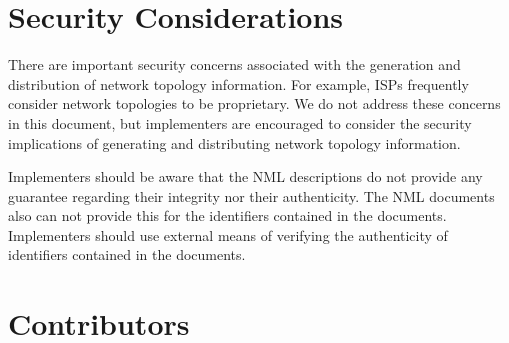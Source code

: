 \documentclass[12pt]{article}  %
\begin{document}
% 
% 
% 
% 

\section{Security Considerations} %
\label{sec:security_considerations}


There are important security concerns associated with the generation and distribution of network topology information. For example, ISPs frequently consider network topologies to be proprietary. We do not address these concerns in this document, but implementers are encouraged to consider the security implications of generating and distributing network topology information. 

Implementers should be aware that the NML descriptions do not provide any guarantee regarding their integrity nor their authenticity. The NML documents also can not provide this for the identifiers contained in the documents. Implementers should use external means of verifying the authenticity of identifiers contained in the documents.

\section{Contributors}
\end{document}
